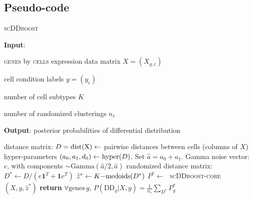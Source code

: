 \documentclass[aoas,preprint]{imsart}
\begin{document}
\subsection*{Pseudo-code}

\begin{algorithm}
\caption{\textsc{scDDboost}}\label{alg:scDDboost}
\raggedright\hspace*{\algorithmicindent} \textbf{Input}: \begin{list}{}{}
 \item  \textsc{genes} by \textsc{cells} expression data matrix $X=(X_{g,c})$
 \item  cell condition labels $y=(y_c)$
 \item  number of cell subtypes $K$
 \item number of randomized clusterings $n_r$
 \end{list}
\hspace*{\algorithmicindent} \textbf{Output}: posterior probabilities of differential distribution
\begin{algorithmic}[2]
\State distance matrix: $D=\rm{dist}(X) \gets$ pairwise distances between cells (columns of $X$)
\State hyper-parameters $(a_0, a_1, d_0) \gets {\mbox {\rm hyper}}(D)$. Set $\hat a = a_0 + a_1$.
\Repeat
\State Gamma noise vector: $e$, with components $\sim \text{Gamma}(\hat a/2,\hat a)$
\State randomized distance matrix: $D^* \gets D / (e\textbf{1}^T +  \textbf{1}e^T)$
\State $\hat z^* \gets {\mbox {\rm $K-$medoids}}(D^*)$
\State $P^* \gets\;$ \textsc{scDDboost-core}$(X,y,\hat z^*)$
\State \textbf{return} $\forall \text{genes} \, g, \, P(\text{DD}_g|X,y) = \frac{1}{n_r}
   \sum_{D^*} P^*_g$
\EndProcedure
\end{algorithmic}
\end{algorithm}
\end{document}
